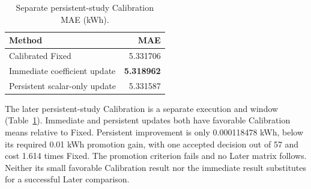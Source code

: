 \documentclass[pdflatex,iicol,sn-mathphys-num]{sn-jnl}
\begin{document}
\begin{table}[t]
\centering\small
\caption{Separate persistent-study Calibration MAE (kWh).}\label{tab:persistent}
\begin{tabularx}{\columnwidth}{@{}Xr@{}}\toprule
Method & MAE\\\midrule
Calibrated Fixed & 5.331706\\
Immediate coefficient update & \textbf{5.318962}\\
Persistent scalar-only update & 5.331587\\
\bottomrule\end{tabularx}
\end{table}

The later persistent-study Calibration is a separate execution and window (Table~\ref{tab:persistent}). Immediate and persistent updates both have favorable Calibration means relative to Fixed. Persistent improvement is only 0.000118478 kWh, below its required 0.01 kWh promotion gain, with one accepted decision out of 57 and cost 1.614 times Fixed. The promotion criterion fails and no Later matrix follows. Neither its small favorable Calibration result nor the immediate result substitutes for a successful Later comparison.
\end{document}
